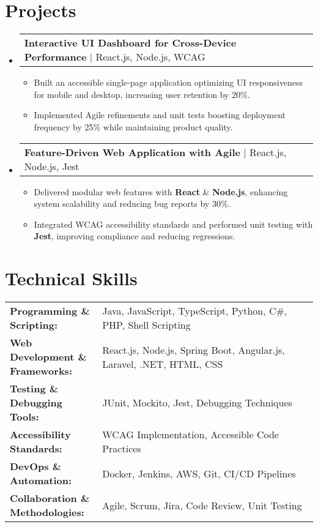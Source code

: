 \documentclass[letterpaper,11pt]{article}
\makeatletter
\newcommand{\resumeItem}[1]{
  \item\footnotesize{
    {#1 \vspace{-2pt}}
  }
}
\newcommand{\resumeProjectHeading}[2]{
    \item
    \begin{tabular*}{1.001\textwidth}{l@{\extracolsep{\fill}}r}
      \small#1 & \textbf{\small #2}\\
    \end{tabular*}\vspace{-7pt}
}
\newcommand{\resumeSubHeadingListStart}{\begin{itemize}[leftmargin=0pt, label={}]}
\newcommand{\resumeSubHeadingListEnd}{\end{itemize}}
\newcommand{\resumeItemListStart}{\begin{itemize}[leftmargin=*]}
\newcommand{\resumeItemListEnd}{\end{itemize}\vspace{-5pt}}
\makeatother
\begin{document}
\section{Projects}
    \vspace{-5pt}
    \resumeSubHeadingListStart
      \resumeProjectHeading
          {\textbf{Interactive UI Dashboard for Cross-Device Performance} | React.js, Node.js, WCAG}{}
          \resumeItemListStart
              \resumeItem{Built an accessible single-page application optimizing UI responsiveness for mobile and desktop, increasing user retention by 20\%.}
              \resumeItem{Implemented Agile refinements and unit tests boosting deployment frequency by 25\% while maintaining product quality.}
          \resumeItemListEnd
          \vspace{-16pt}
      \resumeProjectHeading
          {\textbf{Feature-Driven Web Application with Agile} | React.js, Node.js, Jest}{}
          \resumeItemListStart
              \resumeItem{Delivered modular web features with \textbf{React} & \textbf{Node.js}, enhancing system scalability and reducing bug reports by 30\%.}
              \resumeItem{Integrated WCAG accessibility standards and performed unit testing with \textbf{Jest}, improving compliance and reducing regressions.}
          \resumeItemListEnd
          \vspace{-16pt}
    \resumeSubHeadingListEnd
\vspace{-10pt}
\section{Technical Skills}
        \vspace{-14pt}
        \begin{table}[h]
            \footnotesize
            \begin{tabular}{p{0.3\linewidth} p{0.7\linewidth}}
                \textbf{Programming \& Scripting:} & Java, JavaScript, TypeScript, Python, C\#, PHP, Shell Scripting \\
                \textbf{Web Development \& Frameworks:} & React.js, Node.js, Spring Boot, Angular.js, Laravel, .NET, HTML, CSS \\
                \textbf{Testing \& Debugging Tools:} & JUnit, Mockito, Jest, Debugging Techniques \\
                \textbf{Accessibility Standards:} & WCAG Implementation, Accessible Code Practices \\
                \textbf{DevOps \& Automation:} & Docker, Jenkins, AWS, Git, CI/CD Pipelines \\
                \textbf{Collaboration \& Methodologies:} & Agile, Scrum, Jira, Code Review, Unit Testing \\
            \end{tabular}
        \end{table}
\end{document}
